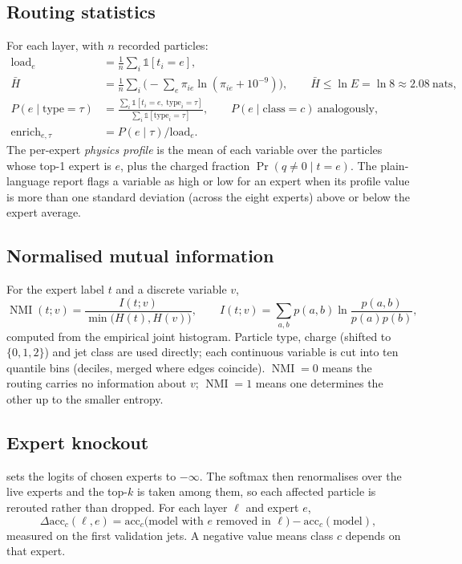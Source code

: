 \documentclass[11pt,a4paper]{article}
\newcommand{\code}[1]{\texttt{\detokenize{#1}}}
\newcommand{\NMI}{\operatorname{NMI}}
\begin{document}
\subsection{Routing statistics}
For each layer, with $n$ recorded particles:
\begin{align}
 \text{load}_e&=\frac1n\sum_i\mathbb 1[t_i=e],\\
 \bar H&=\frac1n\sum_i\Big(-\sum_e\pi_{ie}\ln(\pi_{ie}+10^{-9})\Big),\qquad
 \bar H\le\ln E=\ln 8\approx2.08\ \text{nats},\\
 P(e\mid\text{type}=\tau)&=\frac{\sum_i\mathbb 1[t_i=e,\ \text{type}_i=\tau]}{\sum_i\mathbb 1[\text{type}_i=\tau]},
 \qquad P(e\mid\text{class}=c)\ \text{analogously},\\
 \text{enrich}_{e,\tau}&=P(e\mid\tau)/\text{load}_e .
\end{align}
The per-expert \emph{physics profile} is the mean of each variable over the particles whose
top-1 expert is $e$, plus the charged fraction $\Pr(q\ne0\mid t=e)$. The plain-language report
flags a variable as high or low for an expert when its profile value is more than one
standard deviation (across the eight experts) above or below the expert average.

\subsection{Normalised mutual information}
For the expert label $t$ and a discrete variable $v$,
\begin{equation}
 \NMI(t;v)=\frac{I(t;v)}{\min\big(H(t),H(v)\big)},\qquad
 I(t;v)=\sum_{a,b}p(a,b)\ln\frac{p(a,b)}{p(a)p(b)},
\end{equation}
computed from the empirical joint histogram. Particle type, charge (shifted to
$\{0,1,2\}$) and jet class are used directly; each continuous variable is cut into ten
quantile bins (deciles, merged where edges coincide). $\NMI=0$ means the routing carries no
information about $v$; $\NMI=1$ means one determines the other up to the smaller entropy.

\subsection{Expert knockout}
\label{sec:knockout}
\code{disable_experts} sets the logits of chosen experts to $-\infty$. The softmax then
renormalises over the live experts and the top-$k$ is taken among them, so each affected
particle is rerouted rather than dropped. For each layer $\ell$ and expert $e$,
\begin{equation}
 \Delta\mathrm{acc}_c(\ell,e)=\mathrm{acc}_c\big(\text{model with }e\text{ removed in }\ell\big)
 -\mathrm{acc}_c(\text{model}),
\end{equation}
measured on the first \code{--knockout_jets} validation jets. A negative value means class
$c$ depends on that expert.
\end{document}
